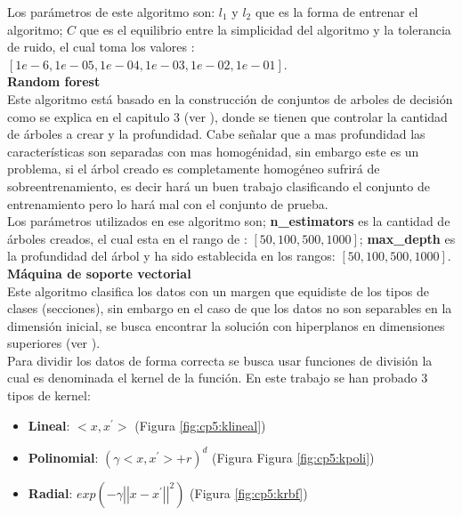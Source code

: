 Los parámetros de este algoritmo son: $l_1$ y $l_2$ que es la forma de entrenar el algoritmo; $C$ que es el equilibrio entre la simplicidad del algoritmo y la tolerancia de ruido, el cual toma los valores :$[1e-6, 1e-05, 1e-04, 1e-03, 1e-02, 1e-01]$.\\





\textbf{Random forest}\\

Este algoritmo está basado en la construcción de conjuntos de arboles de decisión como se explica en el capitulo 3 (ver ), donde se tienen que controlar la cantidad de árboles a crear y la profundidad. Cabe señalar que a mas profundidad las características son separadas con mas homogénidad, sin embargo este es un problema, si el árbol creado es completamente homogéneo sufrirá de sobre\-entrenamiento, es decir hará un buen trabajo clasificando el conjunto de entrenamiento pero lo hará mal con el conjunto de prueba.\\

Los parámetros utilizados en ese algoritmo son; \textbf{n\_estimators} es la cantidad de árboles creados, el cual esta en el rango de : $[50, 100, 500, 1000]$; \textbf{max\_depth} es la profundidad del árbol y ha sido establecida en los rangos: $[50, 100, 500, 1000]$.\\

\textbf{Máquina de soporte vectorial}\\

Este algoritmo clasifica los datos con un margen que equidiste de los tipos de clases (secciones), sin embargo en el caso de que los datos no son separables en la dimensión inicial, se busca encontrar la solución con hiperplanos en dimensiones superiores (ver ).\\

Para dividir los datos de forma correcta se busca usar funciones de división la cual es denominada el kernel de la función. En este trabajo se han probado 3 tipos de kernel: 

\begin{itemize}

	\item \textbf{Lineal}: $<x,x^{'}>$ (Figura \ref{fig:cp5:klineal})

	\item \textbf{Polinomial}: $(\gamma <x,x^{'}>+r)^{d}$ (Figura Figura \ref{fig:cp5:kpoli})

	\item \textbf{Radial}: $exp(-\gamma {\left|\left| x-x^{'} \right|\right|}^2)$ (Figura \ref{fig:cp5:krbf})

\end{itemize}

